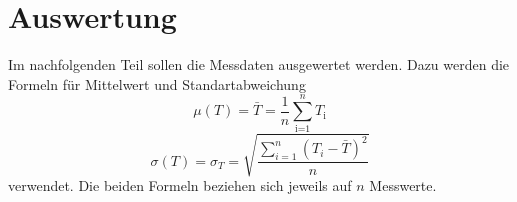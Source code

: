 \section{Auswertung}
\label{sec:Auswertung}
Im nachfolgenden Teil sollen die Messdaten ausgewertet werden. Dazu werden die Formeln für
Mittelwert und Standartabweichung
\begin{equation}
	\mu(T) = \bar{T}=\frac{1}{n}\sum_{\textrm{i=1}}^n T_\textrm{i}
	\label{eqn:mittelwert}
\end{equation}
\begin{equation}
	\sigma(T) = \sigma_T = \sqrt{\frac{\sum_{i=1}^{n}(T_i-\bar{T})^2}{n}}
	\label{eqn:standardabweichung}
\end{equation}
\noindent
verwendet. Die beiden Formeln beziehen sich jeweils auf $n$ Messwerte.


